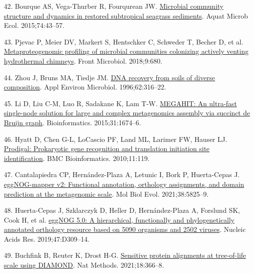 \documentclass[
  12 pt,
]{article}
\newlength{\cslhangindent}
\newlength{\cslentryspacingunit} %
\newenvironment{CSLReferences}[2] %
 {%
  \setlength{\parindent}{0pt}
  \ifodd #1
  \let\oldpar\par
  \def\par{\hangindent=\cslhangindent\oldpar}
  \fi
  \setlength{\parskip}{#2\cslentryspacingunit}
 }%
 {}
\begin{document}
\begin{CSLReferences}{0}{0}
\leavevmode{}%
42. Bourque AS, Vega-Thurber R, Fourqurean JW. \href{https://doi.org/10.3354/ame01725}{Microbial community structure and dynamics in restored subtropical seagrass sediments}. Aquat Microb Ecol. 2015;74:43--57.

\leavevmode{}%
43. Pjevac P, Meier DV, Markert S, Hentschker C, Schweder T, Becher D, et al. \href{https://doi.org/10.3389/fmicb.2018.00680}{Metaproteogenomic profiling of microbial communities colonizing actively venting hydrothermal chimneys}. Front Microbiol. 2018;9:680.

\leavevmode{}%
44. Zhou J, Bruns MA, Tiedje JM. \href{https://doi.org/10.1128/aem.62.2.316-322.1996}{{DNA} recovery from soils of diverse composition}. Appl Environ Microbiol. 1996;62:316--22.

\leavevmode{}%
45. Li D, Liu C-M, Luo R, Sadakane K, Lam T-W. \href{https://doi.org/10.1093/bioinformatics/btv033}{{MEGAHIT}: An ultra-fast single-node solution for large and complex metagenomics assembly via succinct de {Bruijn} graph}. Bioinformatics. 2015;31:1674--6.

\leavevmode{}%
46. Hyatt D, Chen G-L, LoCascio PF, Land ML, Larimer FW, Hauser LJ. \href{https://doi.org/10.1186/1471-2105-11-119}{Prodigal: Prokaryotic gene recognition and translation initiation site identification}. BMC Bioinformatics. 2010;11:119.

\leavevmode{}%
47. Cantalapiedra CP, Hernández-Plaza A, Letunic I, Bork P, Huerta-Cepas J. \href{https://doi.org/10.1093/molbev/msab293}{{eggNOG-mapper} v2: Functional annotation, orthology assignments, and domain prediction at the metagenomic scale}. Mol Biol Evol. 2021;38:5825--9.

\leavevmode{}%
48. Huerta-Cepas J, Szklarczyk D, Heller D, Hernández-Plaza A, Forslund SK, Cook H, et al. \href{https://doi.org/10.1093/nar/gky1085}{{eggNOG} 5.0: A hierarchical, functionally and phylogenetically annotated orthology resource based on 5090 organisms and 2502 viruses}. Nucleic Acids Res. 2019;47:D309--14.

\leavevmode{}%
49. Buchfink B, Reuter K, Drost H-G. \href{https://doi.org/10.1038/s41592-021-01101-x}{Sensitive protein alignments at tree-of-life scale using {DIAMOND}}. Nat Methods. 2021;18:366--8.


\end{CSLReferences}
\end{document}
